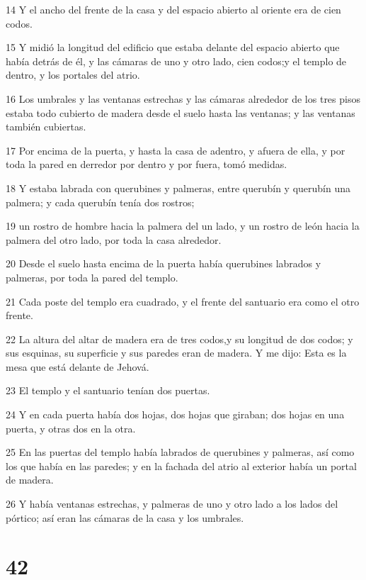 \par 14 Y el ancho del frente de la casa y del espacio abierto al oriente era de cien codos.
\par 15 Y midió la longitud del edificio que estaba delante del espacio abierto que había detrás de él, y las cámaras de uno y otro lado, cien codos;y el templo de dentro, y los portales del atrio.
\par 16 Los umbrales y las ventanas estrechas y las cámaras alrededor de los tres pisos estaba todo cubierto de madera desde el suelo hasta las ventanas; y las ventanas también cubiertas.
\par 17 Por encima de la puerta, y hasta la casa de adentro, y afuera de ella, y por toda la pared en derredor por dentro y por fuera, tomó medidas.
\par 18 Y estaba labrada con querubines y palmeras, entre querubín y querubín una palmera; y cada querubín tenía dos rostros;
\par 19 un rostro de hombre hacia la palmera del un lado, y un rostro de león hacia la palmera del otro lado, por toda la casa alrededor.
\par 20 Desde el suelo hasta encima de la puerta había querubines labrados y palmeras, por toda la pared del templo.
\par 21 Cada poste del templo era cuadrado, y el frente del santuario era como el otro frente.
\par 22 La altura del altar de madera era de tres codos,y su longitud de dos codos; y sus esquinas, su superficie y sus paredes eran de madera. Y me dijo: Esta es la mesa que está delante de Jehová.
\par 23 El templo y el santuario tenían dos puertas.
\par 24 Y en cada puerta había dos hojas, dos hojas que giraban; dos hojas en una puerta, y otras dos en la otra.
\par 25 En las puertas del templo había labrados de querubines y palmeras, así como los que había en las paredes; y en la fachada del atrio al exterior había un portal de madera.
\par 26 Y había ventanas estrechas, y palmeras de uno y otro lado a los lados del pórtico; así eran las cámaras de la casa y los umbrales.

\chapter{42}

